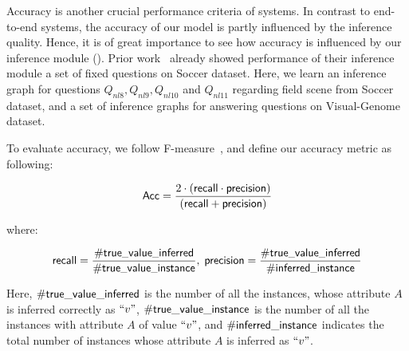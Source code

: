 Accuracy is another crucial performance criteria of \vqa systems. In contrast to end-to-end systems, the accuracy of our model is partly influenced by the inference quality. Hence, it is of great importance to see how accuracy is influenced by our inference module (). Prior work~\cite{peixi2019} already showed performance of their inference module \wrt a set of fixed questions on Soccer dataset. Here, we learn an inference graph for questions $Q_{nl8},Q_{nl9},Q_{nl10}$ and $Q_{nl11}$ regarding field scene from Soccer dataset, and a set of inference graphs for answering questions on Visual-Genome dataset. 

To evaluate accuracy, we follow F-measure~\cite{article}, and define our accuracy metric as following:
\begin{small}
\begin{equation*}
{\ensuremath {\mathsf{Acc}}}=\frac{2\cdot ({\mathsf{recall}}\cdot {\ensuremath {\mathsf{precision}}})}{({\mathsf{recall}}+{\mathsf{precision}})}
\end{equation*}
\end{small}
where:
\begin{small}
\begin{equation*}
\scriptsize
{\ensuremath {\mathsf{recall}}}= \frac{\#{\mathsf{true}}\_{\mathsf{value}}\_{\mathsf{inferred}}}{\#{\mathsf{true}}\_{\mathsf{value}}\_{\mathsf{instance}}},~ {\mathsf{precision}}=\frac{\#{\mathsf{true}}\_{\mathsf{value}}\_{\mathsf{inferred}}}{\#{\mathsf{inferred}}\_{\mathsf{instance}}}
\end{equation*}
\end{small}
Here, $\#{\mathsf{true}}\_{\mathsf{value}}\_{\mathsf{inferred}}$ is the number of all the instances, whose attribute $A$ is inferred correctly as $``v"$,  $\#{\mathsf{true}}\_{\mathsf{value}}\_{\mathsf{instance}}$ is the number of all the instances with attribute $A$ of value $``v"$, and $\#{\mathsf{inferred}}\_{\mathsf{instance}}$ indicates the total number of instances whose attribute $A$ is inferred as $``v"$. 




